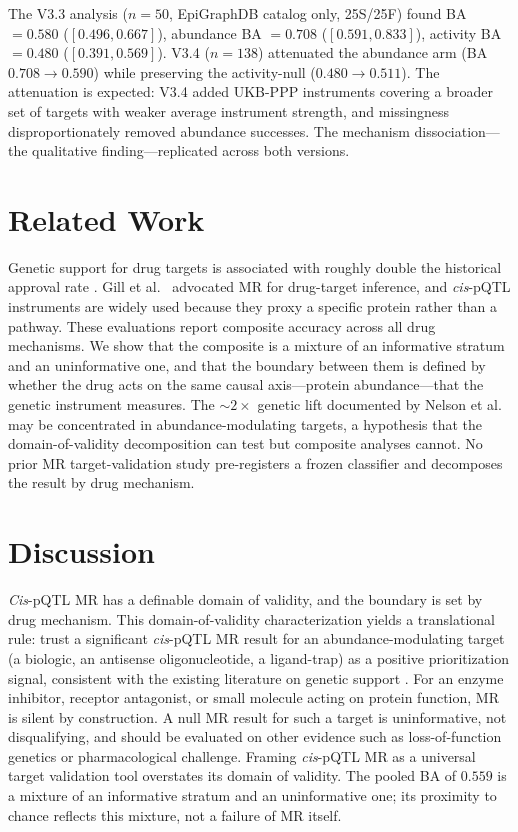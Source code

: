 \documentclass[11pt]{article}
\begin{document}
The V3.3 analysis ($n = 50$, EpiGraphDB catalog only, 25S/25F) found BA $= 0.580$ ($[0.496, 0.667]$), abundance BA $= 0.708$ ($[0.591, 0.833]$), activity BA $= 0.480$ ($[0.391, 0.569]$). V3.4 ($n = 138$) attenuated the abundance arm (BA $0.708 \rightarrow 0.590$) while preserving the activity-null ($0.480 \rightarrow 0.511$). The attenuation is expected: V3.4 added UKB-PPP instruments covering a broader set of targets with weaker average instrument strength, and missingness disproportionately removed abundance successes. The mechanism dissociation---the qualitative finding---replicated across both versions.

\section{Related Work}
\label{sec:related}

Genetic support for drug targets is associated with roughly double the historical approval rate \cite{nelson2015support, king2019greater, minikel2024refining}. Gill et al.~\cite{gill2021mendelian} advocated MR for drug-target inference, and \emph{cis}-pQTL instruments \cite{zheng2020phenome} are widely used because they proxy a specific protein rather than a pathway. These evaluations report composite accuracy across all drug mechanisms. We show that the composite is a mixture of an informative stratum and an uninformative one, and that the boundary between them is defined by whether the drug acts on the same causal axis---protein abundance---that the genetic instrument measures. The ${\sim}2\times$ genetic lift documented by Nelson et al.~\cite{nelson2015support} may be concentrated in abundance-modulating targets, a hypothesis that the domain-of-validity decomposition can test but composite analyses cannot. No prior MR target-validation study pre-registers a frozen classifier and decomposes the result by drug mechanism.

\section{Discussion}
\label{sec:discussion}

\emph{Cis}-pQTL MR has a definable domain of validity, and the boundary is set by drug mechanism. This domain-of-validity characterization yields a translational rule: trust a significant \emph{cis}-pQTL MR result for an abundance-modulating target (a biologic, an antisense oligonucleotide, a ligand-trap) as a positive prioritization signal, consistent with the existing literature on genetic support \cite{nelson2015support}. For an enzyme inhibitor, receptor antagonist, or small molecule acting on protein function, MR is silent by construction. A null MR result for such a target is uninformative, not disqualifying, and should be evaluated on other evidence such as loss-of-function genetics or pharmacological challenge. Framing \emph{cis}-pQTL MR as a universal target validation tool overstates its domain of validity. The pooled BA of $0.559$ is a mixture of an informative stratum and an uninformative one; its proximity to chance reflects this mixture, not a failure of MR itself.
\end{document}
